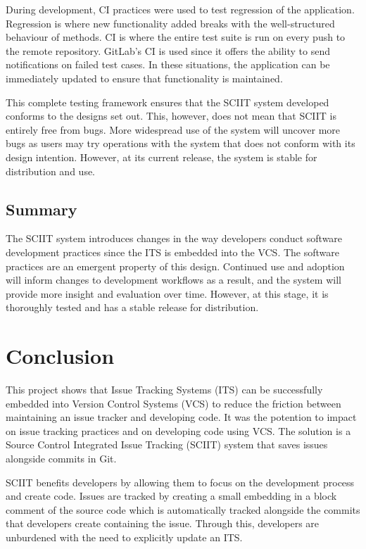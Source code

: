 \documentclass{mproj}
\begin{document}
During development, CI practices were used to test regression of the application. Regression is where new functionality added breaks with the well-structured behaviour of methods. CI is where the entire test suite is run on every push to the remote repository. GitLab’s CI is used since it offers the ability to send notifications on failed test cases. In these situations, the application can be immediately updated to ensure that functionality is maintained.

This complete testing framework ensures that the SCIIT system developed conforms to the designs set out. This, however, does not mean that SCIIT is entirely free from bugs. More widespread use of the system will uncover more bugs as users may try operations with the system that does not conform with its design intention. However, at its current release, the system is stable for distribution and use.

\section{Summary}

The SCIIT system introduces changes in the way developers conduct software development practices since the ITS is embedded into the VCS. The software practices are an emergent property of this design. Continued use and adoption will inform changes to development workflows as a result, and the system will provide more insight and evaluation over time. However, at this stage, it is thoroughly tested and has a stable release for distribution.


\chapter{Conclusion}\label{conclusion}

This project shows that Issue Tracking Systems (ITS) can be successfully embedded into Version Control Systems (VCS) to reduce the friction between maintaining an issue tracker and developing code. It was the potention to impact on issue tracking practices and on developing code using VCS. The solution is a Source Control Integrated Issue Tracking (SCIIT) system that saves issues alongside commits in Git.

SCIIT benefits developers by allowing them to focus on the development process and create code. Issues are tracked by creating a small embedding in a block comment of the source code which is automatically tracked alongside the commits that developers create containing the issue. Through this, developers are unburdened with the need to explicitly update an ITS.
\end{document}
